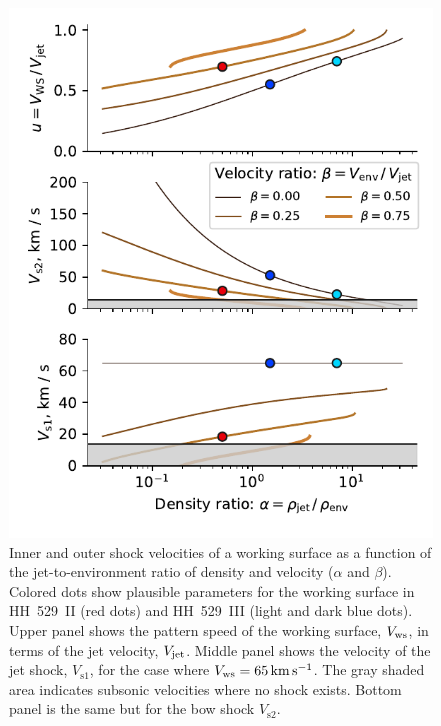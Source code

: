 \documentclass[useAMS, usenatbib]{mnras}
\begin{document}
\begin{figure}
  \centering
  \includegraphics[width=\linewidth]{shock-velocities}
  \caption{Inner and outer shock velocities of a working surface
    as a function of the jet-to-environment ratio of density and velocity
    (\(\alpha\) and \(\beta\)).
    Colored dots show plausible parameters for the working surface in
    HH~529~II (red dots) and
    HH~529~III (light and dark blue dots).
    Upper panel shows the pattern speed of the working surface, \(V_{\mathrm{ws}}\),
    in terms of the jet velocity, \(V_{\mathrm{jet}}\).
    Middle panel shows the velocity of the jet shock, \(V_{\mathrm{s1}}\),
    for the case where \(V_{\mathrm{ws}} = \SI{65}{km.s^{-1}}\).
    The gray shaded area indicates subsonic velocities where no shock exists. 
    Bottom panel is the same but for the bow shock \(V_{\mathrm{s2}}\).
  }
  
  \label{fig:shock-velocities}
\end{figure}
\end{document}
